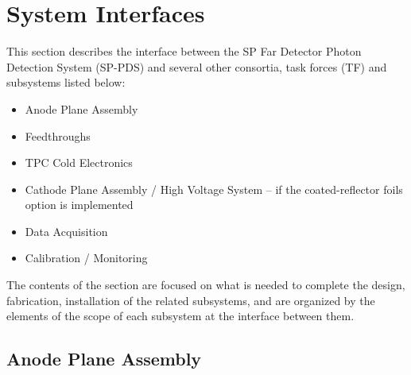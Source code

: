 \section{System Interfaces}
\label{sec:fdsp-pd-intfc}



This section describes the interface between the SP Far Detector Photon Detection System (SP-PDS) and several other consortia, task forces (TF) and subsystems listed below:

\begin{itemize}
\item Anode Plane Assembly
\item{Feedthroughs}
\item TPC Cold Electronics 
\item{Cathode Plane Assembly / High Voltage System -- if the coated-reflector foils option is implemented}
\item Data Acquisition
\item Calibration / Monitoring
\end{itemize}
%
The contents of the section are focused on what is needed to complete the design, fabrication, installation of the related subsystems, and are organized by the elements of the scope of each subsystem at the interface between them.


\subsection{Anode Plane Assembly}
\label{sec:fdsp-pd-intfc-apa}



